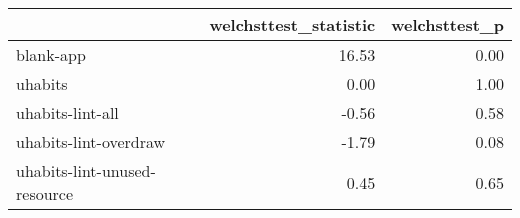 \begin{tabular}{lrr}
\toprule
{} &  welchsttest\_statistic &  welchsttest\_p \\
\midrule
blank-app                    &                  16.53 &           0.00 \\
uhabits                      &                   0.00 &           1.00 \\
uhabits-lint-all             &                  -0.56 &           0.58 \\
uhabits-lint-overdraw        &                  -1.79 &           0.08 \\
uhabits-lint-unused-resource &                   0.45 &           0.65 \\
\bottomrule
\end{tabular}
